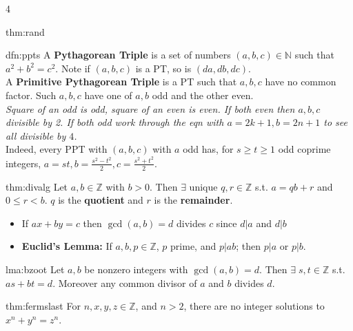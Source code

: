 \documentclass[landscape, 8pt]{extarticle}
\begin{document}
\begin{multicols*}{4}
\begin{thm}{thm:rand}{ }
		\end{thm}
		
		
		\begin{dfn}{dfn:ppts}{ }
			A \textbf{Pythagorean Triple} is a set of numbers $(a, b, c) \in \mathbb{N}$ such that $a^2 + b^2 = c^2$. Note if $(a, b, c)$ is a PT, so is $(da, db, dc)$.\\
			A \textbf{Primitive Pythagorean Triple} is a PT such that $a, b, c$ have no common factor. Such $a, b, c$ have one of $a, b$ odd and the other even.\\
			\textit{Square of an odd is odd, square of an even is even. If both even then $a, b, c$ divisible by 2. If both odd work through the eqn with $a = 2k + 1, b = 2n + 1$ to see all divisible by $4$.}\\
			Indeed, every PPT with $(a, b, c)$ with $a$ odd has, for $s \ge t \ge 1$ odd coprime integers, $a = st, b = \frac{s^2 - t^2}{2}, c = \frac{s^2 + t^2}{2}$.
			
		\end{dfn}
		
		
		\begin{thm}{thm:divalg}{ }
			Let $a, b\in \mathbb{Z}$ with $b > 0$. Then $\exists$ unique $q, r\in \mathbb{Z}$ s.t. $a = qb + r$ and $0 \le r < b$. $q$ is the \textbf{quotient} and $r$ is the \textbf{remainder}.
			\begin{itemize}
				\item If $ax + by = c$ then $\gcd(a, b) = d$ divides $c$ since $d|a$ and $d|b$
				\item \textbf{Euclid's Lemma:} If $a, b, p\in \mathbb{Z}$, $p$ prime, and $p|ab$; then $p|a$ or $p|b$.
			\end{itemize}
			
		\end{thm}
		
		
		\begin{lma}{lma:bzoot}{ }
			Let $a, b$ be nonzero integers with $\gcd(a, b) = d$. Then $\exists \; s, t\in \mathbb{Z}$ s.t. $as + bt = d$. Moreover any common divisor of $a$ and $b$ divides $d$.
			
		\end{lma}
		
		
		\begin{thm}{thm:fermslast}{ }
			For $n, x, y, z\in \mathbb{Z}$, and $n > 2$, there are no integer solutions to $x^n + y^n = z^n$.
			
		\end{thm}
		

\end{multicols*}
\end{document}
